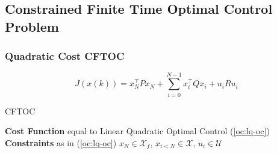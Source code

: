 \subsection{Constrained Finite Time Optimal Control Problem}

\subsubsection{Quadratic Cost CFTOC}
\[
  J(x(k)) = x_N^\top P x_N + \sum_{i=0}^{N-1}x_i^\top Q x_i + u_i R u_i
\]
\begin{sstTitleBox}{
    CFTOC
  }
  \begin{sstOnlyFrame}
    \textbf{Cost Function} equal to
    Linear Quadratic Optimal Control (\ref{oc:lq-oc})
    \textbf{Constraints}
    as in (\ref{oc:lq-oc})
    \ssthl{ + }
    $ x_N      \in \mathcal{X}_f$,
    $ x_{i<N}  \in \mathcal{X}$,
    $ u_i      \in \mathcal{U}$
  \end{sstOnlyFrame}
\end{sstTitleBox}
